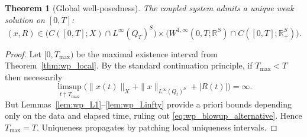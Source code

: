 \documentclass[pdflatex,sn-mathphys-num]{sn-jnl}%
\newtheorem{theorem}{Theorem}[section]
\begin{document}
\begin{theorem}[Global well-posedness]\label{thm:wp_global}
The coupled system admits a unique weak solution on \([0,T]\):
\[
(x,R)\in
\big(C([0,T];X)\cap L^\infty(Q_T)^S\big)
\times
\big(W^{1,\infty}(0,T;\mathbb R^S)\cap C([0,T];\mathbb R_+^S)\big).
\]
\end{theorem}
\begin{proof}
Let \([0,T_{\max})\) be the maximal existence interval from Theorem~\ref{thm:wp_local}.
By the standard continuation principle, if \(T_{\max}<T\) then necessarily
\begin{equation}\label{eq:wp_blowup_alternative}
\limsup_{t\uparrow T_{\max}}
\Big(\|x(t)\|_X+\|x\|_{L^\infty(Q_t)^S}+|R(t)|\Big)=\infty.
\end{equation}
But Lemmas~\ref{lem:wp_L1}--\ref{lem:wp_Linfty} provide a priori bounds depending only
on the data and elapsed time, ruling out \eqref{eq:wp_blowup_alternative}.
Hence \(T_{\max}=T\). Uniqueness propagates by patching local uniqueness intervals.
\end{proof}
\end{document}
